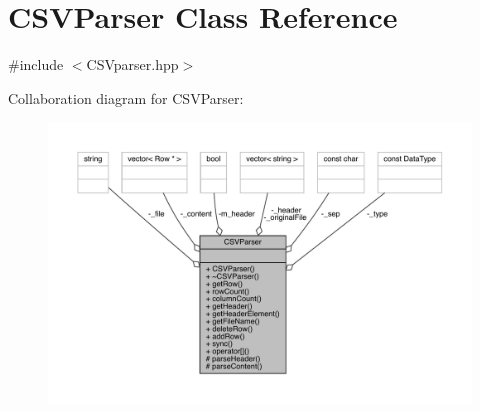 \hypertarget{class_c_s_v_parser}{}\section{C\+S\+V\+Parser Class Reference}
\label{class_c_s_v_parser}


{\ttfamily \#include $<$C\+S\+Vparser.\+hpp$>$}



Collaboration diagram for C\+S\+V\+Parser\+:\nopagebreak
\begin{figure}[H]
\begin{center}
\leavevmode
\includegraphics[width=350pt]{class_c_s_v_parser__coll__graph}
\end{center}
\end{figure}

